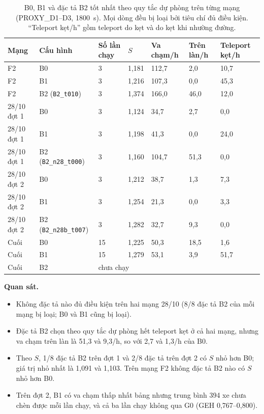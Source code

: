 \documentclass[../DoAn.tex]{subfiles}
\begin{document}
\begin{table}[H]
\centering
\small
\setlength{\tabcolsep}{3pt}
\caption{B0, B1 và đặc tả B2 tốt nhất theo quy tắc dự phòng trên từng mạng (PROXY\_D1--D3, 1800~s). Mọi dòng đều bị loại bởi tiêu chí đủ điều kiện. ``Teleport kẹt/h'' gồm teleport do kẹt và do kẹt khi nhường đường.}
\label{table:4.nets_results}
\begin{tabular}{|p{2.2cm}|p{3.5cm}|p{1.1cm}|p{1.1cm}|p{1.6cm}|p{1.6cm}|p{1.6cm}|}
\hline
\textbf{Mạng} & \textbf{Cấu hình} & \textbf{Số lần chạy} & \textbf{$S$} & \textbf{Va chạm/h} & \textbf{Trên làn/h} & \textbf{Teleport kẹt/h} \\ \hline
F2 & B0 & 3 & 1,181 & 112,7 & 2,0 & 10,7 \\ \hline
F2 & B1 & 3 & 1,216 & 107,3 & 0,0 & 45,3 \\ \hline
F2 & B2 (\texttt{B2\_t010}) & 3 & 1,374 & 166,0 & 46,0 & 12,0 \\ \hline
28/10 đợt 1 & B0 & 3 & 1,124 & 34,7 & 2,7 & 0,0 \\ \hline
28/10 đợt 1 & B1 & 3 & 1,198 & 41,3 & 0,0 & 24,0 \\ \hline
28/10 đợt 1 & B2 (\texttt{B2\_n28\_t000}) & 3 & 1,160 & 104,7 & 51,3 & 0,0 \\ \hline
28/10 đợt 2 & B0 & 3 & 1,212 & 38,7 & 1,3 & 7,3 \\ \hline
28/10 đợt 2 & B1 & 3 & 1,254 & 21,3 & 0,0 & 3,3 \\ \hline
28/10 đợt 2 & B2 (\texttt{B2\_n28b\_t007}) & 3 & 1,282 & 32,7 & 9,3 & 0,0 \\ \hline
Cuối & B0 & 15 & 1,225 & 50,3 & 18,5 & 1,6 \\ \hline
Cuối & B1 & 15 & 1,279 & 53,1 & 3,9 & 51,7 \\ \hline
Cuối & B2 & \multicolumn{5}{l|}{chưa chạy} \\ \hline
\end{tabular}
\end{table}

\textbf{Quan sát.}
\begin{itemize}
    \item Không đặc tả nào đủ điều kiện trên hai mạng 28/10 (8/8 đặc tả B2 của mỗi mạng bị loại; B0 và B1 cũng bị loại).
    \item Đặc tả B2 chọn theo quy tắc dự phòng hết teleport kẹt ở cả hai mạng, nhưng va chạm trên làn là 51,3 và 9,3/h, so với 2,7 và 1,3/h của B0.
    \item Theo $S$, 1/8 đặc tả B2 trên đợt 1 và 2/8 đặc tả trên đợt 2 có $S$ nhỏ hơn B0; giá trị nhỏ nhất là 1,091 và 1,103. Trên mạng F2 không đặc tả B2 nào có $S$ nhỏ hơn B0.
    \item Trên đợt 2, B1 có va chạm thấp nhất bảng nhưng trung bình 394 xe chưa chèn được mỗi lần chạy, và cả ba lần chạy không qua G0 (GEH 0,767--0,800).
\end{itemize}
\end{document}

